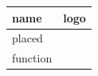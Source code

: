 \documentclass[11pt,a4paper]{article}
\begin{document}
\begin{table}[h]
\begin{tabular}{|l|l|}
\hline
name & logo \\ \hline
placed & %
 \\ \hline
function & %
 \\ \hline
\end{tabular}
\end{table}
\end{document}
